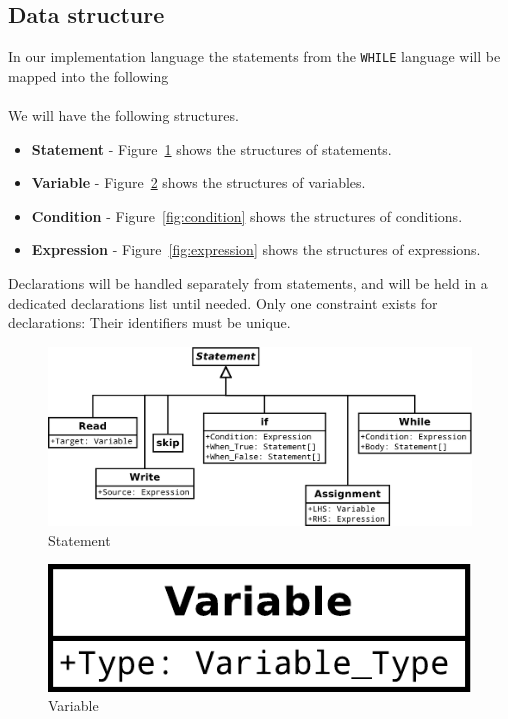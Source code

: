 \subsection{Data structure}
In our implementation language the statements from the \texttt{WHILE} language will be mapped into the following  
\\\\
We will have the following structures.
\begin{itemize}
	\item \textbf{Statement} - Figure~\ref{fig:statement} shows the structures of statements.
	\item \textbf{Variable} - Figure~\ref{fig:variable} shows the structures of variables.
	\item \textbf{Condition} - Figure~\ref{fig:condition} shows the structures of conditions.
	\item \textbf{Expression} - Figure~\ref{fig:expression} shows the structures of expressions.
\end{itemize}
Declarations will be handled separately from statements, and will be held in a dedicated declarations list until needed. Only one constraint exists for declarations: Their identifiers must be unique.

\begin{figure}[h]
	\centering
	\includegraphics[scale=.3]{../fig/Statement}
	\caption{Statement}
	\label{fig:statement}
\end{figure}

\begin{figure}[h]
	\centering
	\includegraphics[scale=.3]{../fig/Variable}
	\caption{Variable}
	\label{fig:variable}
\end{figure}

